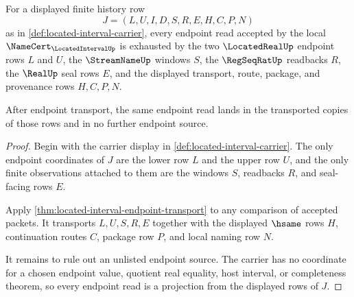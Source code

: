 \begin{theorem}
\label{thm:locatedinterval-endpoint-window-readback-exhaustion}
For a displayed finite history row
$$
J=(L,U,I,D,S,R,E,H,C,P,N)
$$
as in \autoref{def:located-interval-carrier}, every endpoint read accepted by the local $\NameCert_{\LocatedIntervalUp}$ is exhausted by the two $\LocatedRealUp$ endpoint rows $L$ and $U$, the $\StreamNameUp$ windows $S$, the $\RegSeqRatUp$ readbacks $R$, the $\RealUp$ seal rows $E$, and the displayed transport, route, package, and provenance rows $H,C,P,N$.

After endpoint transport, the same endpoint read lands in the transported copies of those rows and in no further endpoint source.
\end{theorem}
\begin{proof}
Begin with the carrier display in \autoref{def:located-interval-carrier}. The only endpoint coordinates of $J$ are the lower row $L$ and the upper row $U$, and the only finite observations attached to them are the windows $S$, readbacks $R$, and seal-facing rows $E$.

Apply \autoref{thm:located-interval-endpoint-transport} to any comparison of accepted packets. It transports $L,U,S,R,E$ together with the displayed $\hsame$ rows $H$, continuation routes $C$, package row $P$, and local naming row $N$.

It remains to rule out an unlisted endpoint source. The carrier has no coordinate for a chosen endpoint value, quotient real equality, host interval, or completeness theorem, so every endpoint read is a projection from the displayed rows of $J$.
\end{proof}

